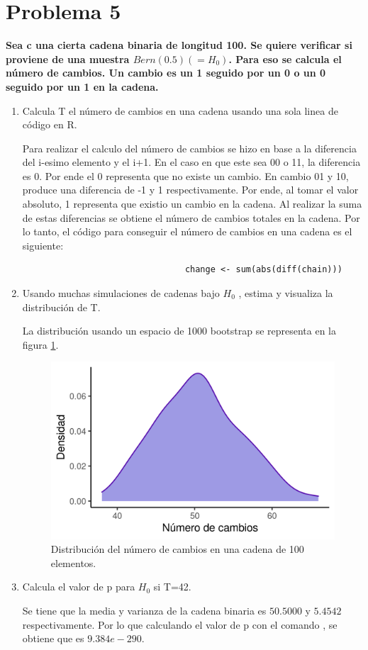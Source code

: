 \section*{Problema 5}

\textbf{Sea c una cierta cadena binaria de longitud 100. Se quiere verificar si proviene de una muestra $Bern(0.5)(=H_0)$. Para eso se calcula el número de cambios. Un cambio es un 1 seguido por un 0 o un 0 seguido por un 1 en la cadena.}

\begin{enumerate}
	\item  Calcula T el número de cambios en una cadena usando una sola linea de código en R.

	      Para realizar el calculo del número de cambios se hizo en base a la diferencia del i-esimo elemento y el i+1. En el caso en que este sea 00 o 11, la diferencia es 0. Por ende el 0 representa que no existe un cambio. En cambio 01 y 10, produce una diferencia de -1 y 1 respectivamente. Por ende, al tomar el valor absoluto, 1 representa que existio un cambio en la cadena. Al realizar la suma de estas diferencias se obtiene el número de cambios totales en la cadena. Por lo tanto, el código para conseguir el número de cambios en una cadena es el siguiente:

	      \begin{verbatim}
								change <- sum(abs(diff(chain)))
			\end{verbatim}

	\item Usando muchas simulaciones de cadenas bajo $H_0$ , estima y visualiza la distribución de T.

	      La distribución usando un espacio de 1000 bootstrap se representa en la figura \ref{fig:problema5_distribution}.

	      \begin{figure}[H]
		      \centering
		      \includegraphics[width=14cm]{Graphics/problema05.png}
		      \caption{Distribución del número de cambios en una cadena de 100 elementos.}
		      \label{fig:problema5_distribution}
	      \end{figure}
	\item Calcula el valor de p para $H_0$ si T=42.

	      Se tiene que la media y varianza de la cadena binaria es $50.5000$ y $5.4542$ respectivamente. Por lo que calculando el valor de p con el comando , se obtiene que es $9.384e-290$.


\end{enumerate}
